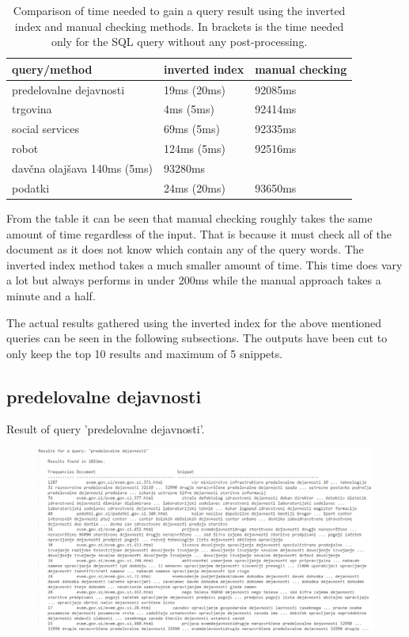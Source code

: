 \documentclass[9pt]{IEEEtran}
\begin{document}
\begin{table}[ht]
\begin{tabu} to 1.0\columnwidth {|X[l]| X[l] | X[l] |}
\hline
query/method            & inverted index & manual checking \\ \hline
predelovalne dejavnosti &      19ms   (20ms)       &           92085ms      \\ \hline
trgovina                &      4ms     (5ms)     &         92414ms        \\ \hline
social services         &       69ms    (5ms)     &         92335ms        \\ \hline
robot                       &        124ms (5ms)        &          92516ms       \\ \hline
davčna olajšava           140ms   (5ms)         &        93280ms        &                 \\ \hline
podatki                       &         24ms (20ms)      &        93650ms         \\ \hline
\end{tabu}
\label{tab1}
\caption{Comparison of time needed to gain a query result using the inverted index and manual checking methods. In brackets is the time needed only for the SQL query without any post-processing.}
\end{table}

From the table it can be seen that manual checking roughly takes the same amount of time regardless of the input.
That is because it must check all of the document as it does not know which contain any of the query words.
The inverted index method takes a much smaller amount of time. 
This time does vary a lot but always performs in under 200ms while the manual approach takes a minute and a half.

The actual results gathered using the inverted index for the above mentioned queries can be seen in the following subsections.
The outputs have been cut to only keep the top 10 results and maximum of 5 snippets.

\onecolumn
\subsection{predelovalne dejavnosti}

Result of query 'predelovalne dejavnosti'.
\begin{figure}[ht]
    \centering
    \includegraphics[width=1\columnwidth]{predelovalne_dejavnosti.png}
    \label{fig1}
\end{figure}
\clearpage
\end{document}
